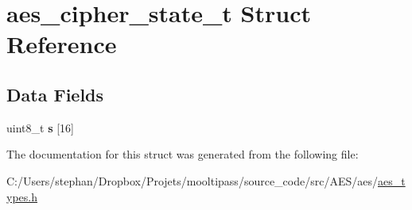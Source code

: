 \hypertarget{structaes__cipher__state__t}{\section{aes\-\_\-cipher\-\_\-state\-\_\-t Struct Reference}
\label{structaes__cipher__state__t}
}
\subsection*{Data Fields}
\begin{DoxyCompactItemize}
\item 
\hypertarget{structaes__cipher__state__t_ae9267f97d76009b78c1502fc433d0f97}{uint8\-\_\-t {\bfseries s} \mbox{[}16\mbox{]}}\label{structaes__cipher__state__t_ae9267f97d76009b78c1502fc433d0f97}

\end{DoxyCompactItemize}


The documentation for this struct was generated from the following file\-:\begin{DoxyCompactItemize}
\item 
C\-:/\-Users/stephan/\-Dropbox/\-Projets/mooltipass/source\-\_\-code/src/\-A\-E\-S/aes/\hyperlink{aes__types_8h}{aes\-\_\-types.\-h}\end{DoxyCompactItemize}
